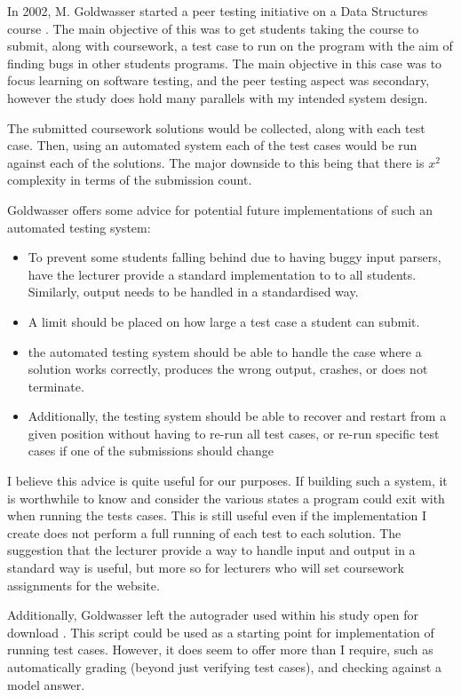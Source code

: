 \documentclass[a4paper,11pt]{report}
\begin{document}
In 2002, M. Goldwasser started a peer testing initiative on a Data Structures course \cite{goldwasser_gimmick_2002}.  The main objective of this was to get students taking the course to submit, along with coursework, a test case to run on the program with the aim of finding bugs in other students programs. The main objective in this case was to focus learning on software testing, and the peer testing aspect was secondary, however the study does hold many parallels with my intended system design.\par
The submitted coursework solutions would be collected, along with each test case. Then, using an automated system each of the test cases would be run against each of the solutions. The major downside to this being that there is $x^2$ complexity in terms of the submission count.\par
Goldwasser offers some advice for potential future implementations of such an automated testing system:
\begin{itemize}
 \item To prevent some students falling behind due to having buggy input parsers, have the lecturer provide a standard implementation to to all students. Similarly, output needs to be handled in a standardised way.
 \item A limit should be placed on how large a test case a student can submit.
 \item the automated testing system should be able to handle the case where a solution works correctly, produces the wrong output, crashes, or does not terminate.
 \item Additionally, the testing system should be able to recover and restart from a given position without having to re-run all test cases, or re-run specific test cases if one of the submissions should change
\end{itemize}
I believe this advice is quite useful for our purposes. If building such a system, it is worthwhile to know and consider the various states a program could exit with when running the tests cases. This is still useful even if the implementation I create does not perform a full running of each test to each solution. The suggestion that the lecturer provide a way to handle input and output in a standard way is useful, but more so for lecturers who will set coursework assignments for the website.\par
Additionally, Goldwasser left the autograder used within his study open for download \cite{goldwasser_autograde_2002}. This script could be used as a starting point for implementation of running test cases. However, it does seem to offer more than I require, such as automatically grading (beyond just verifying test cases), and checking against a model answer.
\end{document}
